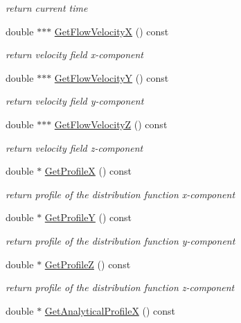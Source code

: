 \begin{DoxyCompactItemize}
\begin{DoxyCompactList}\small\item\em return current time \end{DoxyCompactList}\item 
double $\ast$$\ast$$\ast$ \mbox{\hyperlink{classkinetic_ad7344c18f324d71b943928da869c9a09}{Get\+Flow\+VelocityX}} () const
\begin{DoxyCompactList}\small\item\em return velocity field x-\/component \end{DoxyCompactList}\item 
double $\ast$$\ast$$\ast$ \mbox{\hyperlink{classkinetic_a7c07f65ef9e49e1a513925f6280ae0bc}{Get\+Flow\+VelocityY}} () const
\begin{DoxyCompactList}\small\item\em return velocity field y-\/component \end{DoxyCompactList}\item 
double $\ast$$\ast$$\ast$ \mbox{\hyperlink{classkinetic_ab2c9e6ba7a4a3c1cb731368c222ecb31}{Get\+Flow\+VelocityZ}} () const
\begin{DoxyCompactList}\small\item\em return velocity field z-\/component \end{DoxyCompactList}\item 
double $\ast$ \mbox{\hyperlink{classkinetic_ab994b8c6236881440ac410168bc9405e}{Get\+ProfileX}} () const
\begin{DoxyCompactList}\small\item\em return profile of the distribution function x-\/component \end{DoxyCompactList}\item 
double $\ast$ \mbox{\hyperlink{classkinetic_a73c1b7ab68870948599682f999e82fa6}{Get\+ProfileY}} () const
\begin{DoxyCompactList}\small\item\em return profile of the distribution function y-\/component \end{DoxyCompactList}\item 
double $\ast$ \mbox{\hyperlink{classkinetic_aa4c537077cc449d37cb152e972a4811b}{Get\+ProfileZ}} () const
\begin{DoxyCompactList}\small\item\em return profile of the distribution function z-\/component \end{DoxyCompactList}\item 
double $\ast$ \mbox{\hyperlink{classkinetic_aecfcf87f283eb405fcfda20e40bb9868}{Get\+Analytical\+ProfileX}} () const

\end{DoxyCompactItemize}
